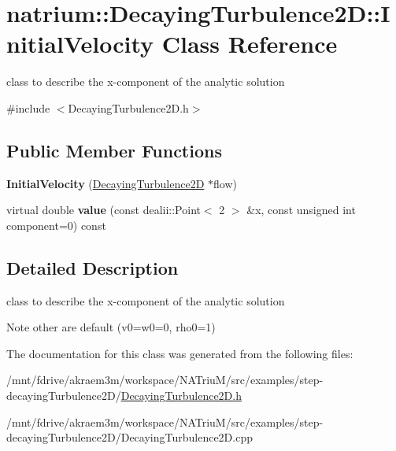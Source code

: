 \hypertarget{classnatrium_1_1DecayingTurbulence2D_1_1InitialVelocity}{
\section{natrium::DecayingTurbulence2D::InitialVelocity Class Reference}
\label{classnatrium_1_1DecayingTurbulence2D_1_1InitialVelocity}
}


class to describe the x-\/component of the analytic solution  


{\ttfamily \#include $<$DecayingTurbulence2D.h$>$}\subsection*{Public Member Functions}
\begin{DoxyCompactItemize}
\item 
\hypertarget{classnatrium_1_1DecayingTurbulence2D_1_1InitialVelocity_ab8632d9959752588576d389c112eae8d}{
{\bfseries InitialVelocity} (\hyperlink{classnatrium_1_1DecayingTurbulence2D}{DecayingTurbulence2D} $\ast$flow)}
\label{classnatrium_1_1DecayingTurbulence2D_1_1InitialVelocity_ab8632d9959752588576d389c112eae8d}

\item 
\hypertarget{classnatrium_1_1DecayingTurbulence2D_1_1InitialVelocity_ae31d9783b7a5b8c079ac939b72092ca6}{
virtual double {\bfseries value} (const dealii::Point$<$ 2 $>$ \&x, const unsigned int component=0) const }
\label{classnatrium_1_1DecayingTurbulence2D_1_1InitialVelocity_ae31d9783b7a5b8c079ac939b72092ca6}

\end{DoxyCompactItemize}


\subsection{Detailed Description}
class to describe the x-\/component of the analytic solution \begin{DoxyNote}{Note}
other are default (v0=w0=0, rho0=1) 
\end{DoxyNote}


The documentation for this class was generated from the following files:\begin{DoxyCompactItemize}
\item 
/mnt/fdrive/akraem3m/workspace/NATriuM/src/examples/step-\/decayingTurbulence2D/\hyperlink{DecayingTurbulence2D_8h}{DecayingTurbulence2D.h}\item 
/mnt/fdrive/akraem3m/workspace/NATriuM/src/examples/step-\/decayingTurbulence2D/DecayingTurbulence2D.cpp\end{DoxyCompactItemize}
